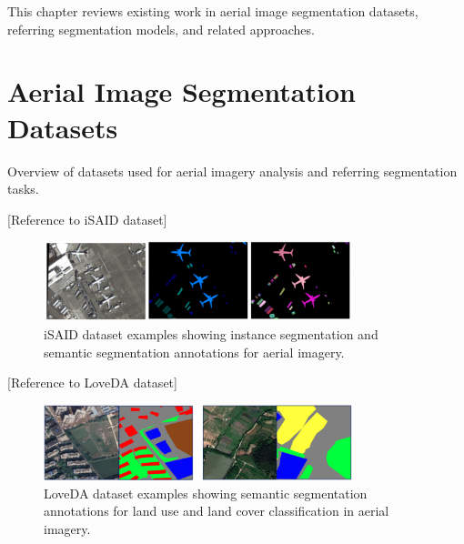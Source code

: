 \cleardoublepage
\label{chap:architecture}

This chapter reviews existing work in aerial image segmentation datasets, referring segmentation models, and related approaches.

\section{Aerial Image Segmentation Datasets}

Overview of datasets used for aerial imagery analysis and referring segmentation tasks.

[Reference to iSAID dataset] %

\begin{figure}[htbp]
\centering
\includegraphics[width=0.8\textwidth]{Images/isaid_examples.png}
\caption{iSAID dataset examples showing instance segmentation and semantic segmentation annotations for aerial imagery.}
\label{fig:isaid_examples}
\end{figure}

[Reference to LoveDA dataset] %

\begin{figure}[htbp]
\centering
\includegraphics[width=0.8\textwidth]{Images/loveda.png}
\caption{LoveDA dataset examples showing semantic segmentation annotations for land use and land cover classification in aerial imagery.}
\label{fig:loveda_examples}
\end{figure}

